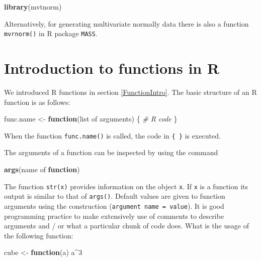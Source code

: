 \documentclass[
]{book}
\newenvironment{Shaded}{\begin{snugshade}}{\end{snugshade}}
\newcommand{\CommentTok}[1]{\textcolor[rgb]{0.56,0.35,0.01}{\textit{#1}}}
\newcommand{\ControlFlowTok}[1]{\textcolor[rgb]{0.13,0.29,0.53}{\textbf{#1}}}
\newcommand{\DecValTok}[1]{\textcolor[rgb]{0.00,0.00,0.81}{#1}}
\newcommand{\FunctionTok}[1]{\textcolor[rgb]{0.13,0.29,0.53}{\textbf{#1}}}
\newcommand{\NormalTok}[1]{#1}
\newcommand{\OtherTok}[1]{\textcolor[rgb]{0.56,0.35,0.01}{#1}}
\newcommand{\SpecialCharTok}[1]{\textcolor[rgb]{0.81,0.36,0.00}{\textbf{#1}}}
\begin{document}
\begin{Shaded}
\begin{Highlighting}[]
\FunctionTok{library}\NormalTok{(mvtnorm)}
\end{Highlighting}
\end{Shaded}

Alternatively, for generating multivariate normally data there is also a function \texttt{mvrnorm()} in R package \texttt{MASS}.

\section{Introduction to functions in R}\label{introduction-to-functions-in-r}

We introduced R functions in section \ref{FunctionIntro}. The basic structure of an R function is as follows:

\begin{Shaded}
\begin{Highlighting}[]
\NormalTok{func.name }\OtherTok{\textless{}{-}} \ControlFlowTok{function}\NormalTok{(list of arguments)}
\NormalTok{\{}
  \CommentTok{\# R code}
\NormalTok{\}}
\end{Highlighting}
\end{Shaded}

When the function \texttt{func.name()} is called, the code in \texttt{\{\ \}} is executed.

The arguments of a function can be inspected by using the command

\begin{Shaded}
\begin{Highlighting}[]
\FunctionTok{args}\NormalTok{(name of }\ControlFlowTok{function}\NormalTok{)}
\end{Highlighting}
\end{Shaded}

The function \texttt{str(x)} provides information on the object \texttt{x}. If \texttt{x} is a function its output is similar to that of \texttt{args()}. Default values are given to function arguments using the construction (\texttt{argument\ name\ =\ value}). It is good programming practice to make extensively use of comments to describe arguments and / or what a particular chunk of code does.
What is the usage of the following function:

\begin{Shaded}
\begin{Highlighting}[]
\NormalTok{cube }\OtherTok{\textless{}{-}} \ControlFlowTok{function}\NormalTok{(a) a}\SpecialCharTok{\^{}}\DecValTok{3}
\end{Highlighting}
\end{Shaded}
\end{document}
